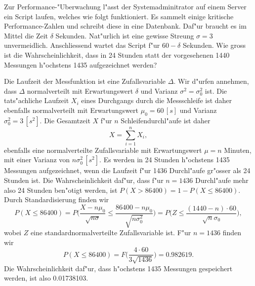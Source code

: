 Zur Performance-"Uberwachung l"asst der Systemadminitrator auf einem Server
ein Script laufen, welches wie folgt funktioniert. Es sammelt einige
kritische Performance-Zahlen und schreibt diese in eine Datenbank.
Daf"ur braucht es im Mittel die Zeit $\delta$ Sekunden. Nat"urlich
ist eine gewisse Streung $\sigma=3$ unvermeidlich.
Anschliessend wartet das Script f"ur $60-\delta$ Sekunden.
Wie gross ist die Wahrscheinlichkeit, dass in 24 Stunden statt
der vorgesehenen 1440 Messungen h"ochstens 1435 aufgezeichnet werden?

\begin{loesung}
Die Laufzeit der Messfunktion ist eine Zufallsvariable $\Delta$.
Wir d"urfen annehmen, dass $\Delta$ normalverteilt mit Erwartungswert
$\delta$ und Varianz $\sigma^2=\sigma_0^2$ ist. Die tats"achliche Laufzeit $X_i$ eines
Durchgangs durch die Messschleife ist daher ebenfalls normalverteilt
mit Erwartungswert $\mu_0=60\,[s]$ und Varianz $\sigma_0^2=3\,[s^2]$.
Die Gesamtzeit $X$ f"ur
$n$ Schleifendurchl"aufe ist daher
\[
X=\sum_{i=1}^nX_i,
\]
ebenfalls eine normalverteilte Zufallsvariable
mit Erwartungswert $\mu = n$ Minuten,
mit einer Varianz von $n\sigma_0^2\,[s^2]$.
Es werden in 24 Stunden h"ochstens 1435 Messungen aufgezeichnet,
wenn die Laufzeit f"ur
1436 Durchl"aufe gr"osser als 24 Stunden ist. Die Wahrscheinlichkeit daf"ur,
dass f"ur $n=1436$ Durchl"aufe mehr also 24 Stunden ben"otigt werden, 
ist $P(X > 86400) = 1-P(X\le 86400)$.
Durch Standardisierung finden wir
\[
P(X\le 86400)=P\biggl(
\frac{X-n\mu_0}{\sqrt{n\sigma}}\le \frac{86400-n\mu_0}{\sqrt{n\sigma_0^2}}
\biggr)
=P\biggl(
Z\le\frac{(1440-n)\cdot 60}{\sqrt{n}\sigma_0}
\biggr),
\]
wobei $Z$ eine standardnormalverteilte Zufallsvariable ist. F"ur $n=1436$
finden wir
\[
P(X\le 86400)=F\biggl(
\frac{4\cdot 60}{3\sqrt{1436}}
\biggr)=0.982619.
\]
Die Wahrscheinlichkeit daf"ur, dass h"ochstens 1435 Messungen gespeichert
werden, ist also 0.01738103.
\end{loesung}
